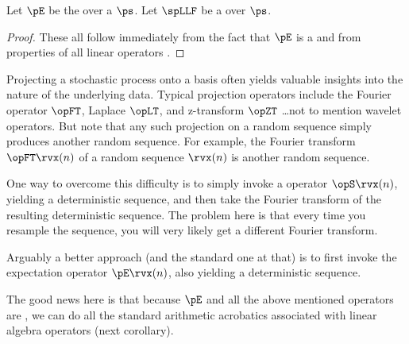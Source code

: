 \begin{corollary}
\label{cor:pE_linop}
Let $\pE$ be the  over a  $\ps$.
Let $\spLLF$ be a  over $\ps$.
\end{corollary}
\begin{proof}
These all follow immediately from the fact that $\pE$ is a  
and from properties of all linear operators .
\end{proof}

\begin{remark}
Projecting a stochastic process onto a basis often yields valuable insights
into the nature of the underlying data.
Typical projection operators include the Fourier operator $\opFT$, Laplace $\opLT$,
and z-transform $\opZT$ \ldots not to mention wavelet operators.
But note that any such projection on a random sequence simply produces another random sequence.
For example, the Fourier transform $\opFT\rvx(n)$ of a random sequence $\rvx(n)$ is another random
sequence.

One way to overcome this difficulty is to simply invoke a  operator $\opS\rvx(n)$,
yielding a deterministic sequence, and then take the Fourier transform of the resulting
deterministic sequence.
The problem here is that every time you resample the sequence, you will very likely get a
different Fourier transform.

Arguably a better approach (and the standard one at that)
is to first invoke the expectation operator $\pE\rvx(n)$, also yielding a deterministic sequence.

The good news here is that because $\pE$ and all the above mentioned operators are ,
we can do all the standard arithmetic acrobatics associated with linear algebra operators (next corollary).
\end{remark}

